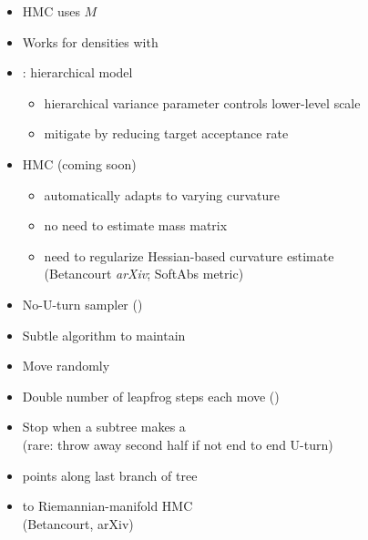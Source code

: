 \documentclass[10pt]{report}
\newcommand{\sld}[1]{\newpage{\noindent\LARGE \ \ \
    \textcolor{MidnightBlue}{\bfseries #1}}\vspace*{4pt}}
\newcommand{\myemph}[1]{{\color{MidnightBlue}{\bfseries #1}}}
\begin{document}
\begin{itemize}
\item \myemph{Euclidean} HMC uses \myemph{global mass matrix} $M$
\item Works for densities with \myemph{position-independent curvature}
\item \myemph{Counterexample}: hierarchical model
  \vspace*{-4pt}
  \begin{itemize}\small
  \item hierarchical variance parameter controls lower-level scale
  \item mitigate by reducing target acceptance rate
  \end{itemize}
  \vfill
\item \myemph{Riemannian-manifold} HMC (coming soon)
  \vspace*{-4pt}
  \begin{itemize}\small
  \item automatically adapts to varying curvature
  \item no need to estimate mass matrix
  \item need to regularize Hessian-based curvature estimate
    \\ {\footnotesize (Betancourt {\slshape arXiv}; SoftAbs metric)}
  \end{itemize}
\end{itemize}

\sld{Adapting HMC During Sampling}

\begin{itemize}
\item No-U-turn sampler (\myemph{NUTS})
\item Subtle algorithm to maintain \myemph{detailed balance}
\item Move randomly \myemph{forward or backward in time}
\item Double number of leapfrog steps each move (\myemph{binary tree})
\item Stop when a subtree makes a \myemph{U-turn}
  \\ {\footnotesize (rare: throw away second half if not end to end U-turn)}
\item \myemph{Slice sample} points along last branch of tree
\item \myemph{Generalized} to Riemannian-manifold HMC
  \\ {\footnotesize (Betancourt, arXiv)}
\end{itemize}

\sld{NUTS vs.\ Gibbs and Metropolis}
\end{document}
